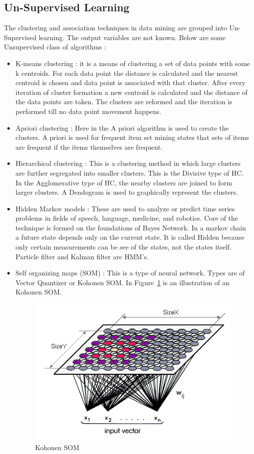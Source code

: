 \subsection{Un-Supervised Learning}
The clustering and association techniques in data mining are grouped into Un-Supervised learning. The output variables are not known.
Below are some Unsupervised class of algorithms :
\begin{itemize}
	\item K-means clustering : it is a means of clustering a set of data points with some k centroids. For each data point the distance is calculated and the nearest centroid is chosen and data point is associated with that cluster. After every iteration of cluster formation a new centroid is calculated and the distance of the data points are taken. The clusters are reformed and the iteration is performed till no data point movement happens.
	\item Apriori clustering : Here in the A priori algorithm is used to create the clusters. A priori is used for frequent item set mining states that sets of items are frequent if the items themselves are frequent. 
	\item Hierarchical clustering : This is a clustering method in which large clusters are further segregated into smaller clusters. This is the Divisive type of HC. In the Agglomerative type of HC, the nearby clusters are joined to form larger clusters. A Dendogram is used to graphically represent the clusters.	
	\item Hidden Markov models : These are used to analyze or predict time series problems in fields of speech, language, medicine, and robotics. Core of the technique is formed on the foundations of Bayes Network. In a markov chain a future state depends only on the current state. It is called Hidden because only certain measurements can be see of the states, not the states itself. Particle filter and Kalman filter are HMM's.
	\item Self organizing maps (SOM) : This is a type of neural network. Types are of Vector Quantizer or Kohonen SOM. In Figure~\ref{fig:kohonen} is an illustration of an Kohonen SOM.
		\begin{figure}[H]
			\includegraphics[scale = 1]{figures/Kohonen.png}
			\centering
			\caption{Kohonen SOM}
			\label{fig:kohonen}
		\end{figure}
\end{itemize}

